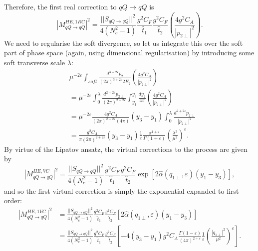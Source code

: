 Therefore, the first real correction to $qQ \to qQ$ is
\begin{equation}
|M_{qQ \to qQ}^{HE, 1RC}|^2 = \frac{||S_{qQ \to qQ}||^2}{4 (N_c^2 - 1)}\frac{g^2 C_{F}}{\hat{t}_1} \frac{g^2 C_{F}}{\hat{t}_2} \left(\frac{4g^2 C_A}{|p_{2 \perp}|^2} \right).
\end{equation}
We need to regularise the soft divergence, so let us integrate this over the soft part of phase space (again, using dimensional regularisation) by introducing some soft transverse scale $\lambda$:
\begin{equation}
\begin{split}
& \mu^{-2 \varepsilon} \int_{soft} \frac{d^{3 + 2 \varepsilon}p_2}{(2 \pi)^{3 + 2 \varepsilon} 2E_2} \left(\frac{4g^2 C_A}{|p_{2 \perp}|^2} \right) \\
& = \mu^{-2 \varepsilon} \int_0^\lambda \frac{d^{2 + 2 \varepsilon}p_{2 \perp}}{(2 \pi)^{2 + 2 \varepsilon}} \int_{y_1}^{y_3} \frac{d y_2}{4 \pi} \left(\frac{4g^2 C_A}{|p_{2 \perp}|^2} \right) \\
&= \mu^{-2 \varepsilon} \frac{4 g^2 C_A}{(2 \pi)^{2 + 2\varepsilon}(4 \pi)} (y_3 - y_1) \int_0^\lambda \frac{d^{2 + 2 \varepsilon}p_{2\perp}}{|p_{2 \perp}|^2} \\
&= \frac{g^2 C_A}{\pi (2 \pi)^{2 + 2 \varepsilon}} (y_3 - y_1) \frac{1}{\varepsilon} \frac{\pi^{1 + \varepsilon}}{\Gamma(1 + \varepsilon)} \left( \frac{\lambda^2}{\mu^2}\right)^\varepsilon.
\end{split}
\end{equation}
By virtue of the Lipatov ansatz, the virtual corrections to the process are given by
\begin{equation}
|M_{qQ \to qQ}^{HE, VC}|^2 = \frac{||S_{qQ \to qQ}||^2}{4 (N_c^2 - 1)}\frac{g^2 C_{F}}{\hat{t}_1} \frac{g^2 C_{F}}{\hat{t}_2} \exp \left[2 \hat{\alpha}(q_{1 \perp}, \varepsilon)(y_1 - y_3) \right],
\end{equation}
and so the first virtual correction is simply the exponential expanded to first order:
\begin{equation}
\begin{split}
|M_{qQ \to qQ}^{HE, 1VC}|^2 &= \frac{||S_{qQ \to qQ}||^2}{4 (N_c^2 - 1)}\frac{g^2 C_{F}}{\hat{t}_1} \frac{g^2 C_{F}}{\hat{t}_2} \left[2 \hat{\alpha}(q_{1 \perp}, \varepsilon)(y_1 - y_3) \right] \\
& = \frac{||S_{qQ \to qQ}||^2}{4 (N_c^2 - 1)}\frac{g^2 C_{F}}{\hat{t}_1} \frac{g^2 C_{F}}{\hat{t}_2} \left[- 4 (y_3 - y_1) g^2 C_A \frac{\Gamma(1 - \varepsilon)}{(4 \pi)^{2 + \varepsilon}} \frac{1}{\varepsilon}  \left( \frac{|q_{1 \perp}|^2}{\mu^2}\right)^\varepsilon \right].
\end{split}
\end{equation}
